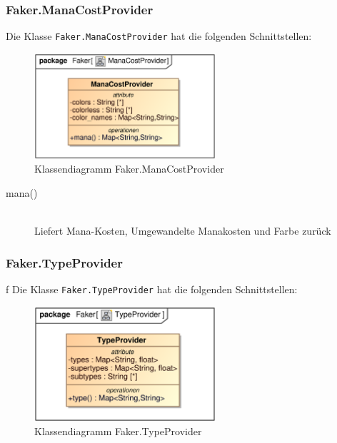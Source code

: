 \subsubsection{Faker.ManaCostProvider}
Die Klasse \verb|Faker.ManaCostProvider| hat die folgenden Schnittstellen:

\begin{figure}[H]
    \myfloatalign
    \includegraphics[width=0.6\textwidth]{gfx/MtGDeepAnalysis/ManaCostProvider.eps}
    \caption{Klassendiagramm Faker.ManaCostProvider}
    \label{fig:class:Faker.ManaCostProvider}
\end{figure}

\begin{description}
    \item[mana()] \hfill \\
    Liefert Mana-Kosten, Umgewandelte Manakosten und Farbe zurück
\end{description}

\subsubsection{Faker.TypeProvider}f
Die Klasse \verb|Faker.TypeProvider| hat die folgenden Schnittstellen:

\begin{figure}[H]
    \myfloatalign
    \includegraphics[width=0.6\textwidth]{gfx/MtGDeepAnalysis/TypeProvider.eps}
    \caption{Klassendiagramm Faker.TypeProvider}
    \label{fig:class:Faker.TypeProvider}
\end{figure}

